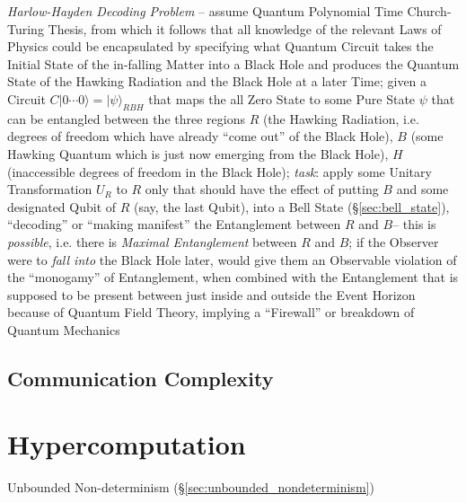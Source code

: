 \emph{Harlow-Hayden Decoding Problem} -- assume Quantum Polynomial Time
Church-Turing Thesis, from which it follows that all knowledge of the relevant
Laws of Physics could be encapsulated by specifying what Quantum Circuit takes
the Initial State of the in-falling Matter into a Black Hole and produces the
Quantum State of the Hawking Radiation and the Black Hole at a later Time; given
a Circuit $C|0 \cdots 0\rangle = |\psi\rangle_{RBH}$ that maps the all Zero
State to some Pure State $\psi$ that can be entangled between the three regions
$R$ (the Hawking Radiation, i.e. degrees of freedom which have already ``come
out'' of the Black Hole), $B$ (some Hawking Quantum which is just now emerging
from the Black Hole), $H$ (inaccessible degrees of freedom in the Black Hole);
\emph{task}: apply some Unitary Transformation $U_R$ to $R$ only that should
have the effect of putting $B$ and some designated Qubit of $R$ (say, the last
Qubit), into a Bell State (\S\ref{sec:bell_state}), ``decoding'' or ``making
manifest'' the Entanglement between $R$ and $B$-- this is \emph{possible}, i.e.
there is \emph{Maximal Entanglement} between $R$ and $B$; if the Observer were
to \emph{fall into} the Black Hole later, would give them an Observable
violation of the ``monogamy'' of Entanglement, when combined with the
Entanglement that is supposed to be present between just inside and outside the
Event Horizon because of Quantum Field Theory, implying a ``Firewall'' or
breakdown of Quantum Mechanics



\subsection{Communication Complexity}\label{sec:communication_complexity}



\section{Hypercomputation}\label{sec:hypercomputation}

Unbounded Non-determinism (\S\ref{sec:unbounded_nondeterminism})



